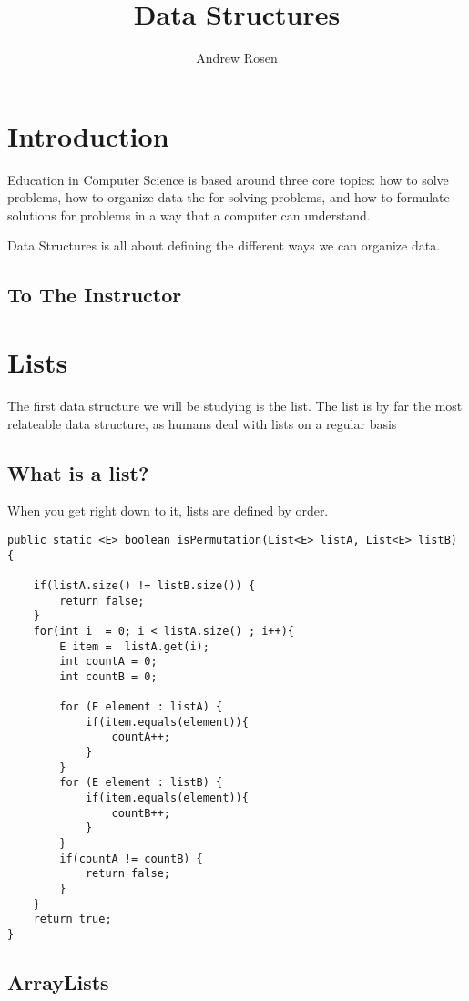 \documentclass[10pt,a4paper]{book}
\begin{document}
\title{Data Structures}
\author{Andrew Rosen}
\date{}
\maketitle
\tableofcontents




\chapter{Introduction}

Education in Computer Science is based around three core topics: how to solve problems, how to organize data the for solving problems, and how to formulate solutions for problems in a way that a computer can understand.


Data Structures is all about defining the different ways we can organize data.

\section{To The Instructor}



\chapter{Lists}
The first data structure we will be studying is the list.
The list is by far the most relateable data structure, as humans deal with lists on a regular basis

\section{What is a list?}
When you get right down to it, lists are defined by order.


\begin{verbatim}
public static <E> boolean isPermutation(List<E> listA, List<E> listB) {
	
	if(listA.size() != listB.size()) {
		return false;
	}
	for(int i  = 0; i < listA.size() ; i++){
		E item =  listA.get(i);
		int countA = 0;
		int countB = 0;
		
		for (E element : listA) {
			if(item.equals(element)){
				countA++;
			}
		}
		for (E element : listB) {
			if(item.equals(element)){
				countB++;
			}
		}
		if(countA != countB) {
			return false;
		}
	}
	return true;
}
\end{verbatim}
\section{ArrayLists}
\end{document}
